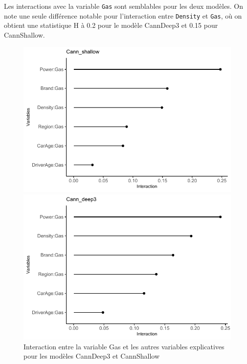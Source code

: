 Les interactions avec la variable \verb=Gas= sont semblables pour les deux modèles. On note une seule différence notable pour l'interaction entre \verb=Density= et \verb=Gas=, où on obtient une statistique H à 0.2 pour le modèle CannDeep3 et 0.15 pour CannShallow.

\begin{figure}
\caption{\label{fig:inter3Gas} Interaction entre la variable Gas et les autres variables explicatives pour les modèles CannDeep3 et CannShallow}
\centering
\begin{minipage}{0.45\linewidth}
\includegraphics[scale=0.6]{Graphiques/interGasShallow}
\end{minipage}
\hfill
\begin{minipage}{0.45\linewidth}
\includegraphics[scale=0.6]{Graphiques/interGasCann}
\end{minipage}
\end{figure}


